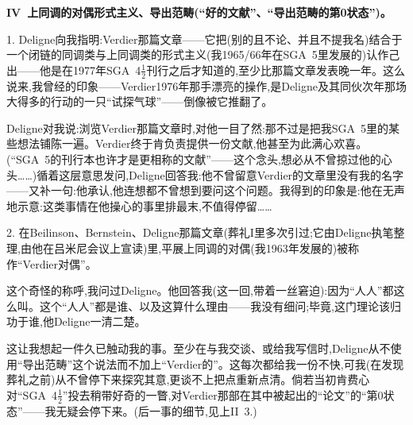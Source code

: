 \textbf{IV~上同调的对偶形式主义、导出范畴(“好的文献”、“导出范畴的第0状态”)。}

\dmark{}1. Deligne向我指明:Verdier那篇文章——它把(别的且不论、并且不提我名)结合于一个闭链的同调类与上同调类的形式主义(我1965/66年在SGA~5里发展的)认作己出——他是在1977年SGA~4$\frac{1}{2}$刊行之后才知道的,至少比那篇文章发表晚一年。这么说来,我曾经的印象——Verdier1976年那手漂亮的操作,是Deligne及其同伙次年那场大得多的行动的一只“试探气球”——倒像被它推翻了。

Deligne对我说:浏览Verdier那篇文章时,对他一目了然:那不过是把我SGA~5里的某些想法铺陈一遍。Verdier终于肯负责提供一份文献,他甚至为此满心欢喜。(“SGA~5的刊行本也许才是更相称的文献”——这个念头,想必从不曾掠过他的心头……)循着这层意思发问,Deligne回答我:他不曾留意Verdier的文章里没有我的名字——又补一句:他承认,他连想都不曾想到要问这个问题。我得到的印象是:他在无声地示意:这类事情在他操心的事里排最末,不值得停留……

2. 在Beilinson、Bernstein、Deligne那篇文章(葬礼I里多次引过;它由Deligne执笔整理,由他在吕米尼会议上宣读)里,平展上同调的对偶(我1963年发展的)被称作“Verdier对偶”。

\dmark{}这个奇怪的称呼,我问过Deligne。他回答我(这一回,带着一丝窘迫):因为“人人”都这么叫。这个“人人”都是谁、以及这算什么理由——我没有细问;毕竟,这门理论该归功于谁,他Deligne一清二楚。

这让我想起一件久已触动我的事。至少在与我交谈、或给我写信时,Deligne从不使用“导出范畴”这个说法而不加上“Verdier的”。这每次都给我一份不快,可我(在发现葬礼之前)从不曾停下来探究其意,更谈不上把点重新点清。倘若当初肯费心对“SGA~4$\frac{1}{2}$”投去稍带好奇的一瞥,对Verdier那部在其中被起出的“论文”的“第0状态”——我无疑会停下来。(后一事的细节,见上II~3.)

